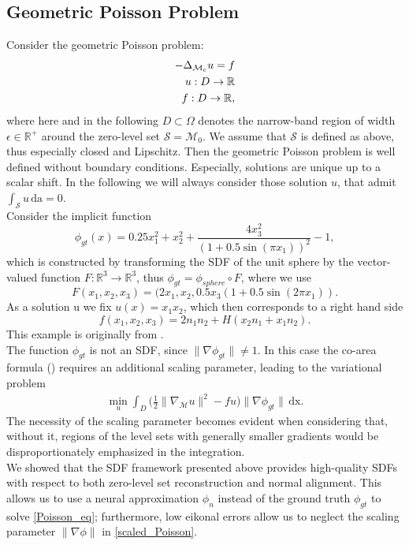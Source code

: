 \documentclass[12pt,openany]{book}
\newcommand{\R}{\mathbb{R}}
\def\S{\mathcal{S}}
\theoremstyle{plainnormal}
\theoremstyle{remark}
\begin{document}
\subsection{Geometric Poisson Problem}\label{section_PoissonPB}
Consider the geometric Poisson problem: \begin{align}\label{Poisson_eq}
    -\Delta_{\mathcal{M}_c} u = f\\
    u: D \rightarrow \R \notag\\
    f: D \rightarrow\R, \notag
\end{align} 
where here and in the following $ D\subset \Omega$ denotes the narrow-band region of width $\epsilon \in\R^+$ around the zero-level set $\S =\mathcal{M}_{ 0}$. We assume that $\mathcal S$ is defined as above, thus especially closed and Lipschitz. Then the geometric Poisson problem is well defined without boundary conditions. Especially, solutions are unique up to a scalar shift. In the following we will always consider those solution $u$, that admit $\int_\S u\, \mathrm{da} = 0$. 
\\
Consider the implicit function 
$$\phi_{gt}(x) = 0.25x_1^2 + x_2^2 + \frac{4x_3^2}{(1+0.5\sin(\pi x_1))^2} - 1,$$
which is constructed by transforming the SDF of the unit sphere by the vector-valued function $F: \R^3 \rightarrow \R^3$, thus $\phi_{gt} = \phi_{sphere} \circ F$, where we use $$F(x_1, x_2,x_3) = (2x_1, x_2, 0.5x_3(1+0.5\sin(2\pi x_1)).$$
As a solution u we fix $u(x) = x_1x_2$, which then corresponds to a right hand side $$f(x_1, x_2, x_3) = 2n_1n_2 + H(x_2n_1 + x_1n_2).$$ This example is originally from \cite{Dziuk_Elliott_2013}.\\
The function $\phi_{gt}$ is not an SDF, since $\|\nabla\phi_{gt}\| \neq 1$. In this case the co-area formula () requires an additional scaling parameter, leading to the variational problem 
\begin{align}
    \min_u\int_D \Big(\frac{1}{2}\|\nabla_\mathcal{M}u\|^2 - fu\Big) \|\nabla \phi_{gt}\| \,\mathrm{dx}.\label{scaled_Poisson}
\end{align}
The necessity of the scaling parameter becomes evident when considering that, without it, regions of the level sets with generally smaller gradients would be disproportionately emphasized in the integration.\\
We showed that the SDF framework presented above provides high-quality SDFs with respect to both zero-level set reconstruction and normal alignment. This allows us to use a neural approximation $\phi_n$ instead of the ground truth $\phi_{gt}$ to solve \cref{Poisson_eq}; furthermore, low eikonal errors allow us to neglect the scaling parameter $\|\nabla \phi\|$ in \cref{scaled_Poisson}. \\
\end{document}
